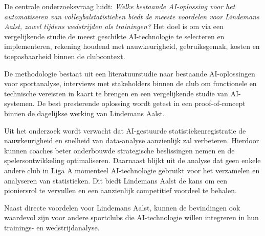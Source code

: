 De centrale onderzoeksvraag luidt: \textit{Welke bestaande AI-oplossing voor het automatiseren van volleybalstatistieken biedt de meeste voordelen voor Lindemans Aalst, zowel tijdens wedstrijden als trainingen?} Het doel is om via een vergelijkende studie de meest geschikte AI-technologie te selecteren en implementeren, rekening houdend met nauwkeurigheid, gebruiksgemak, kosten en toepasbaarheid binnen de clubcontext.

De methodologie bestaat uit een literatuurstudie naar bestaande AI-oplossingen voor sportanalyse, interviews met stakeholders binnen de club om functionele en technische vereisten in kaart te brengen en een vergelijkende studie van AI-systemen. De best presterende oplossing wordt getest in een proof-of-concept binnen de dagelijkse werking van Lindemans Aalst.

Uit het onderzoek wordt verwacht dat AI-gestuurde statistiekenregistratie de nauwkeurigheid en snelheid van data-analyse aanzienlijk zal verbeteren. Hierdoor kunnen coaches beter onderbouwde strategische beslissingen nemen en de spelersontwikkeling optimaliseren. Daarnaast blijkt uit de analyse dat geen enkele andere club in Liga A momenteel AI-technologie gebruikt voor het verzamelen en analyseren van statistieken. Dit biedt Lindemans Aalst de kans om een pioniersrol te vervullen en een aanzienlijk competitief voordeel te behalen.

Naast directe voordelen voor Lindemans Aalst, kunnen de bevindingen ook waardevol zijn voor andere sportclubs die AI-technologie willen integreren in hun trainings- en wedstrijdanalyse.
